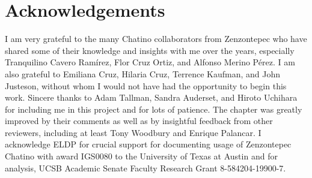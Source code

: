 \documentclass[output=paper]{langscibook}
\begin{document}
\section{Acknowledgements}
I am very grateful to the many Chatino collaborators from Zenzontepec who have shared some of their knowledge and insights with me over the years, especially Tranquilino Cavero Ramírez, Flor Cruz Ortiz, and Alfonso Merino Pérez. I am also grateful to Emiliana Cruz, Hilaria Cruz, Terrence Kaufman, and John Justeson, without whom I would not have had the opportunity to begin this work. Sincere thanks to Adam Tallman, Sandra Auderset, and Hiroto Uchihara for including me in this project and for lots of patience. The chapter was greatly improved by their comments as well as by insightful feedback from other reviewers, including at least Tony Woodbury and Enrique Palancar. I acknowledge ELDP for crucial support for documenting usage of Zenzontepec Chatino with award IGS0080 to the University of Texas at Austin and for analysis, UCSB Academic Senate Faculty Research Grant 8-584204-19900-7.


\printglossary

\sloppy\printbibliography[heading=subbibliography,notkeyword=this]
\end{document}
